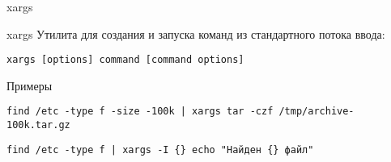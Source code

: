 \begin{frame}[fragile]{xargs}
	\begin{block}{xargs}
			Утилита для создания и запуска команд из стандартного потока ввода:
		\begin{verbatim}
xargs [options] command [command options]
		\end{verbatim}
	
	\end{block}

	\begin{block}{Примеры}
		\begin{verbatim}
find /etc -type f -size -100k | xargs tar -czf /tmp/archive-100k.tar.gz
		\end{verbatim}

		\begin{verbatim}
find /etc -type f | xargs -I {} echo "Найден {} файл"
		\end{verbatim}
	
	\end{block}
\end{frame}



